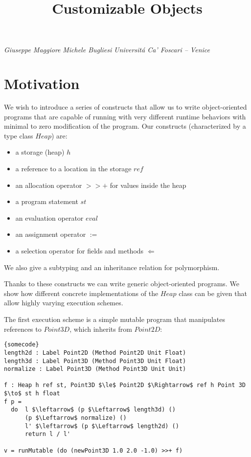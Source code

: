 \documentclass[a4paper]{article}
\begin{document}
\title{Customizable Objects}

\textit{Giuseppe Maggiore}
\textit{Michele Bugliesi}
\textit{Universitá Ca'  Foscari -- Venice}

\section{Motivation}

We wish to introduce a series of constructs that allow us to write object-oriented programs that are capable of running with
very different runtime behaviors with minimal to zero modification of the program. Our constructs (characterized by a type 
class $Heap$) are:
\begin{itemize}
\item a storage (heap) $h$
\item a reference to a location in the storage $ref$
\item an allocation operator $>>+$ for values inside the heap
\item a program statement $st$
\item an evaluation operator $eval$
\item an assignment operator $:=$
\item a selection operator for fields and methods $\Leftarrow$
\end{itemize}

We also give a subtyping and an inheritance relation for polymorphism.

Thanks to these constructs we can write generic object-oriented programs. We show how different concrete implementations
of the $Heap$ class can be given that allow highly varying execution schemes.

The first execution scheme is a simple mutable program that manipulates references to $Point3D$, which inherits from $Point2D$:
\begin{lstlisting}[frame=tb,mathescape]{somecode}
length2d : Label Point2D (Method Point2D Unit Float)
length3d : Label Point3D (Method Point3D Unit Float)
normalize : Label Point3D (Method Point3D Unit Unit)

f : Heap h ref st, Point3D $\le$ Point2D $\Rightarrow$ ref h Point 3D $\to$ st h float
f p = 
  do  l $\leftarrow$ (p $\Leftarrow$ length3d) ()
      (p $\Leftarrow$ normalize) ()
      l' $\leftarrow$ (p $\Leftarrow$ length2d) ()
      return l / l'

v = runMutable (do (newPoint3D 1.0 2.0 -1.0) >>+ f)
\end{lstlisting}
\end{document}
